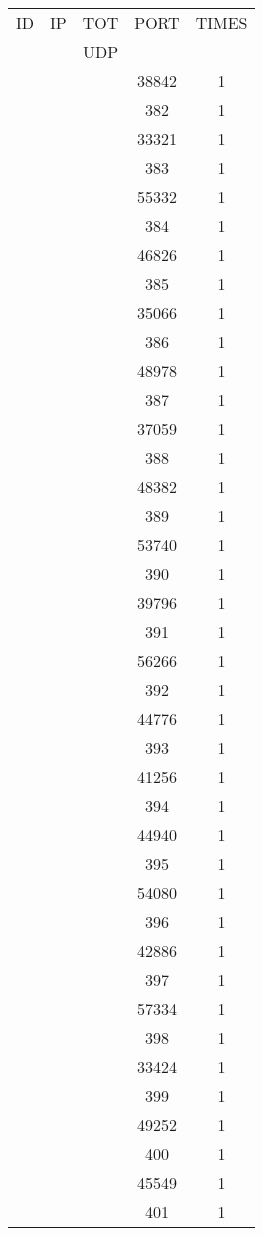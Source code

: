\documentclass[a4paper]{scrartcl}
\begin{document}
\begin{minipage}[b]{0.5\linewidth}
\begin{tabular}{| c | c | c | c | c |}
\hline
ID & IP & TOT & PORT & TIMES \\ 
   &    & UDP &      &       \\ 
\hline
& & & 38842 & 1 \\ & & & 382 & 1 \\ & & & 33321 & 1 \\ & & & 383 & 1 \\ & & & 55332 & 1 \\ & & & 384 & 1 \\ & & & 46826 & 1 \\ & & & 385 & 1 \\ & & & 35066 & 1 \\ & & & 386 & 1 \\ & & & 48978 & 1 \\ & & & 387 & 1 \\ & & & 37059 & 1 \\ & & & 388 & 1 \\ & & & 48382 & 1 \\ & & & 389 & 1 \\ & & & 53740 & 1 \\ & & & 390 & 1 \\ & & & 39796 & 1 \\ & & & 391 & 1 \\ & & & 56266 & 1 \\ & & & 392 & 1 \\ & & & 44776 & 1 \\ & & & 393 & 1 \\ & & & 41256 & 1 \\ & & & 394 & 1 \\ & & & 44940 & 1 \\ & & & 395 & 1 \\ & & & 54080 & 1 \\ & & & 396 & 1 \\ & & & 42886 & 1 \\ & & & 397 & 1 \\ & & & 57334 & 1 \\ & & & 398 & 1 \\ & & & 33424 & 1 \\ & & & 399 & 1 \\ & & & 49252 & 1 \\ & & & 400 & 1 \\ & & & 45549 & 1 \\ & & & 401 & 1 \\ \hline\end{tabular}\end{minipage} \hfill\begin{minipage}[b]{0.5\linewidth}\begin{tabular}{| c | c | c | c | c |}

\end{tabular}
\end{minipage}
\end{document}
